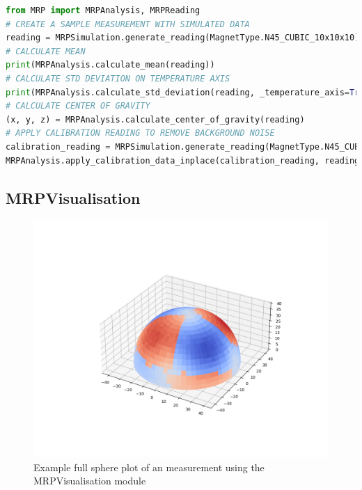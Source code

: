 \begin{lstlisting}[language=Python, caption={MRPAnalysis example code performs several data analysis steps}, label=lst:mrpexample_analysis]
from MRP import MRPAnalysis, MRPReading
# CREATE A SAMPLE MEASUREMENT WITH SIMULATED DATA
reading = MRPSimulation.generate_reading(MagnetType.N45_CUBIC_10x10x10)
# CALCULATE MEAN
print(MRPAnalysis.calculate_mean(reading))
# CALCULATE STD DEVIATION ON TEMPERATURE AXIS
print(MRPAnalysis.calculate_std_deviation(reading, _temperature_axis=True))
# CALCULATE CENTER OF GRAVITY
(x, y, z) = MRPAnalysis.calculate_center_of_gravity(reading)
# APPLY CALIBRATION READING TO REMOVE BACKGROUND NOISE
calibration_reading = MRPSimulation.generate_reading(MagnetType.N45_CUBIC_10x10x10, _ideal = True)
MRPAnalysis.apply_calibration_data_inplace(calibration_reading, reading)
\end{lstlisting}

\hypertarget{mrpvisualisation}{%
\subsection{MRPVisualisation}\label{mrpvisualisation}}

\begin{figure}
\centering
\includegraphics{./generated_images/border_Example_full_sphere_plot_of_an_measurement_using_the_MRPVisualisation_module.png}
\caption{Example full sphere plot of an measurement using the
MRPVisualisation module
\label{Example_full_sphere_plot_of_an_measurement_using_the_MRPVisualisation_module.png}}
\end{figure}

